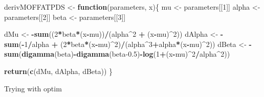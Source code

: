 \documentclass[
]{article}
\newenvironment{Shaded}{\begin{snugshade}}{\end{snugshade}}
\newcommand{\ControlFlowTok}[1]{\textcolor[rgb]{0.13,0.29,0.53}{\textbf{#1}}}
\newcommand{\DecValTok}[1]{\textcolor[rgb]{0.00,0.00,0.81}{#1}}
\newcommand{\FloatTok}[1]{\textcolor[rgb]{0.00,0.00,0.81}{#1}}
\newcommand{\FunctionTok}[1]{\textcolor[rgb]{0.13,0.29,0.53}{\textbf{#1}}}
\newcommand{\NormalTok}[1]{#1}
\newcommand{\OtherTok}[1]{\textcolor[rgb]{0.56,0.35,0.01}{#1}}
\newcommand{\SpecialCharTok}[1]{\textcolor[rgb]{0.81,0.36,0.00}{\textbf{#1}}}
\begin{document}
\begin{Shaded}
\begin{Highlighting}[]
\NormalTok{derivMOFFATPDS }\OtherTok{\textless{}{-}} \ControlFlowTok{function}\NormalTok{(parameters, x)\{}
\NormalTok{  mu }\OtherTok{\textless{}{-}}\NormalTok{ parameters[[}\DecValTok{1}\NormalTok{]]}
\NormalTok{  alpha }\OtherTok{\textless{}{-}}\NormalTok{ parameters[[}\DecValTok{2}\NormalTok{]]}
\NormalTok{  beta }\OtherTok{\textless{}{-}}\NormalTok{ parameters[[}\DecValTok{3}\NormalTok{]]}
  
  
\NormalTok{  dMu }\OtherTok{\textless{}{-}} \SpecialCharTok{{-}}\FunctionTok{sum}\NormalTok{((}\DecValTok{2}\SpecialCharTok{*}\NormalTok{beta}\SpecialCharTok{*}\NormalTok{(x}\SpecialCharTok{{-}}\NormalTok{mu))}\SpecialCharTok{/}\NormalTok{(alpha}\SpecialCharTok{\^{}}\DecValTok{2} \SpecialCharTok{+}\NormalTok{ (x}\SpecialCharTok{{-}}\NormalTok{mu)}\SpecialCharTok{\^{}}\DecValTok{2}\NormalTok{))}
\NormalTok{  dAlpha }\OtherTok{\textless{}{-}} \SpecialCharTok{{-}}\FunctionTok{sum}\NormalTok{(}\SpecialCharTok{{-}}\DecValTok{1}\SpecialCharTok{/}\NormalTok{alpha }\SpecialCharTok{+}\NormalTok{ (}\DecValTok{2}\SpecialCharTok{*}\NormalTok{beta}\SpecialCharTok{*}\NormalTok{(x}\SpecialCharTok{{-}}\NormalTok{mu)}\SpecialCharTok{\^{}}\DecValTok{2}\NormalTok{)}\SpecialCharTok{/}\NormalTok{(alpha}\SpecialCharTok{\^{}}\DecValTok{3}\SpecialCharTok{+}\NormalTok{alpha}\SpecialCharTok{*}\NormalTok{(x}\SpecialCharTok{{-}}\NormalTok{mu)}\SpecialCharTok{\^{}}\DecValTok{2}\NormalTok{))}
\NormalTok{  dBeta }\OtherTok{\textless{}{-}} \SpecialCharTok{{-}}\FunctionTok{sum}\NormalTok{(}\FunctionTok{digamma}\NormalTok{(beta)}\SpecialCharTok{{-}}\FunctionTok{digamma}\NormalTok{(beta}\FloatTok{{-}0.5}\NormalTok{)}\SpecialCharTok{{-}}\FunctionTok{log}\NormalTok{(}\DecValTok{1}\SpecialCharTok{+}\NormalTok{(x}\SpecialCharTok{{-}}\NormalTok{mu)}\SpecialCharTok{\^{}}\DecValTok{2}\SpecialCharTok{/}\NormalTok{alpha}\SpecialCharTok{\^{}}\DecValTok{2}\NormalTok{))}
  
  \FunctionTok{return}\NormalTok{(}\FunctionTok{c}\NormalTok{(dMu, dAlpha, dBeta))}
\NormalTok{\}}
\end{Highlighting}
\end{Shaded}

Trying with optim
\end{document}
